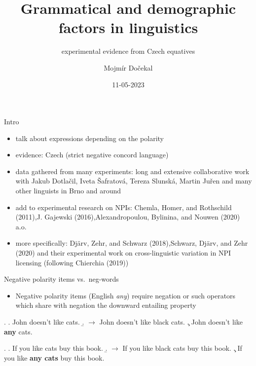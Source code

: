 \documentclass[
  ignorenonframetext,
]{beamer}
\title{Grammatical and demographic factors in linguistics}
\subtitle{experimental evidence from Czech equatives}
\author{Mojmír Dočekal}
\date{11-05-2023}
\institute{Innsbruck}
\providecommand{\tightlist}{%
  \setlength{\itemsep}{0pt}\setlength{\parskip}{0pt}}\usepackage{longtable,booktabs,array}
\begin{document}
\frame{\titlepage}
\ifdefined\Shaded\renewenvironment{Shaded}{\begin{tcolorbox}[breakable, boxrule=0pt, frame hidden, enhanced, sharp corners, interior hidden, borderline west={3pt}{0pt}{shadecolor}]}{\end{tcolorbox}}\fi

\begin{frame}{Intro}
\protect\hypertarget{intro}{}
\begin{itemize}
\tightlist
\item
  talk about expressions depending on the polarity
\item
  evidence: Czech (strict negative concord language)
\item
  data gathered from many experiments: long and extensive collaborative
  work with Jakub Dotlačil, Iveta Šafratová, Tereza Slunská, Martin
  Juřen and many other linguists in Brno and around
\item
  add to experimental research on NPIs: Chemla, Homer, and Rothschild
  (2011),J. Gajewski (2016),Alexandropoulou, Bylinina, and Nouwen (2020)
  a.o.
\item
  more specifically: Djärv, Zehr, and Schwarz (2018),Schwarz, Djärv, and
  Zehr (2020) and their experimental work on cross-linguistic variation
  in NPI licensing (following Chierchia (2019))
\end{itemize}
\end{frame}

\begin{frame}
\begin{block}{Negative polarity items vs.~neg-words}
\protect\hypertarget{negative-polarity-items-vs.-neg-words}{}
\begin{itemize}
\tightlist
\item
  Negative polarity items (English \emph{any}) require negation or such
  operators which share with negation the downward entailing property
\end{itemize}

\ex. \a. John doesn't like cats. \b. \(\rightarrow\) John doesn't like
black cats. \c. John doesn't like \textbf{any} cats.

\ex. \a. If you like cats buy this book. \b. \(\rightarrow\) If you like
black cats buy this book. \c. If you like \textbf{any cats} buy this
book.

~
\end{block}
\end{frame}
\end{document}
